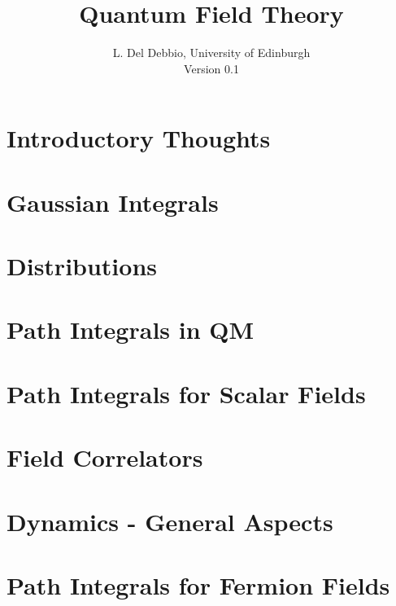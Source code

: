 \documentclass[11pt,twoside]{report}
\begin{document}
\title{Quantum Field Theory}
\author{L. Del Debbio, University of Edinburgh \\
  Version 0.1}

\maketitle
\clearemptydoublepage
\tableofcontents
\clearemptydoublepage


\chapter{Introductory Thoughts}
\label{chap:intro}


\chapter{Gaussian Integrals}
\label{chap:lec0}


\chapter{Distributions}
\label{chap:distr-notes}


\chapter{Path Integrals in QM}
\label{chap:lec1}


\chapter{Path Integrals for Scalar Fields}
\label{cha:path-integr-scal}


\chapter{Field Correlators}
\label{cha:field-corr}


\chapter{Dynamics - General Aspects}
\label{cha:prop-corrs}


\chapter{Path Integrals for Fermion Fields}
\label{cha:path-integr-ferm}

\end{document}
